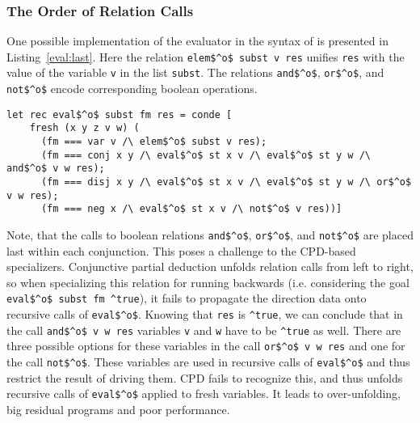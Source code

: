 \subsubsection{The Order of Relation Calls}

One possible implementation of the evaluator in the syntax of \oc{} is presented in Listing~\ref{eval:last}.
Here the relation \lstinline{elem$^o$ subst v res} unifies \lstinline{res} with the value of the variable \lstinline{v} in the list \lstinline{subst}.
The relations \lstinline{and$^o$}, \lstinline{or$^o$}, and \lstinline{not$^o$} encode corresponding boolean operations.

\begin{figure*}[!h]
  \centering
  \begin{minipage}{0.8\textwidth}
    \begin{lstlisting}[label={eval:last}, caption={Evaluator of formulas with boolean operation last}, captionpos=b, frame=tb]
  let rec eval$^o$ subst fm res = conde [
    fresh (x y z v w) (
      (fm === var v /\ elem$^o$ subst v res);
      (fm === conj x y /\ eval$^o$ st x v /\ eval$^o$ st y w /\ and$^o$ v w res);
      (fm === disj x y /\ eval$^o$ st x v /\ eval$^o$ st y w /\ or$^o$ v w res);
      (fm === neg x /\ eval$^o$ st x v /\ not$^o$ v res))]
    \end{lstlisting}
  \end{minipage}
\end{figure*}

Note, that the calls to boolean relations \lstinline{and$^o$}, \lstinline{or$^o$}, and \lstinline{not$^o$} are placed last within each conjunction.
This poses a challenge to the CPD-based specializers.
Conjunctive partial deduction unfolds relation calls from left to right, so when specializing this relation for running backwards (i.e. considering the goal \lstinline{eval$^o$ subst fm ^true}), it fails to propagate the direction data onto recursive calls of \lstinline{eval$^o$}.
Knowing that \lstinline{res} is \lstinline{^true}, we can conclude that in the call \lstinline{and$^o$ v w res} variables \lstinline{v} and \lstinline{w} have to be \lstinline{^true} as well.
There are three possible options for these variables in the call \lstinline{or$^o$ v w res} and one for the call \lstinline{not$^o$}.
These variables are used in recursive calls of \lstinline{eval$^o$} and thus restrict the result of driving them.
CPD fails to recognize this, and thus unfolds recursive calls of \lstinline{eval$^o$} applied to fresh variables.
It leads to over-unfolding, big residual programs and poor performance.

